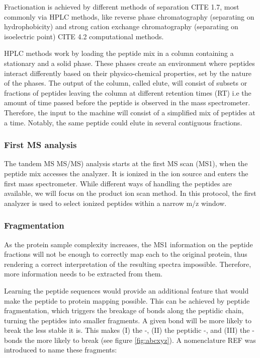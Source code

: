 \documentclass[11pt, a4paper]{report}
\begin{document}
Fractionation is achieved by different methods of separation CITE 1.7, most commonly via \ac{HPLC} methods, like reverse phase chromatography (separating on hydrophobicity) and strong cation exchange chromatography (separating on isoelectric point)  CITE 4.2 computational methods.

\ac{HPLC} methods work by loading the peptide mix in a column containing a stationary and a solid phase. These phases create an environment where peptides interact differently based on their physico-chemical properties, set by the nature of the phases. The output of the column, called elute, will consist of subsets or fractions of peptides leaving the column at different retention times (\ac{RT}) i.e the amount of time passed before the peptide is observed in the mass spectrometer. Therefore, the input to the machine will consist of a simplified mix of peptides at a time. Notably, the same peptide could elute in several contiguous fractions.


\subsubsection{First MS analysis}

The tandem MS \ac{MS/MS}) analysis starts at the first \ac{MS} scan (\ac{MS1}), when the peptide mix accesses the analyzer. It is ionized in the ion source and enters the first mass spectrometer. While different ways of handling the peptides are available, we will focus on the product ion scan method. In this protocol, the first analyzer is used to select ionized peptides within a narrow m/z window.


\subsubsection{Fragmentation}
\label{subsubsec:fragmentation}

As the protein sample complexity increases, the \ac{MS1} information on the peptide fractions will not be enough to correctly map each to the original protein, thus rendering a correct interpretation of the resulting spectra impossible. Therefore, more information needs to be extracted from them.

Learning the peptide sequences would provide an additional feature that would make the peptide to protein mapping possible. This can be achieved by peptide fragmentation, which triggers the breakage of bonds along the peptidic chain, turning the peptides into smaller fragments. A given bond will be more likely to break the less stable it is. This makes (I) the -, (II) the peptidic -, and (III) the - bonds the more likely to break (see figure \ref{fig:abcxyz}). A nomenclature REF was introduced to name these fragments:
\end{document}
